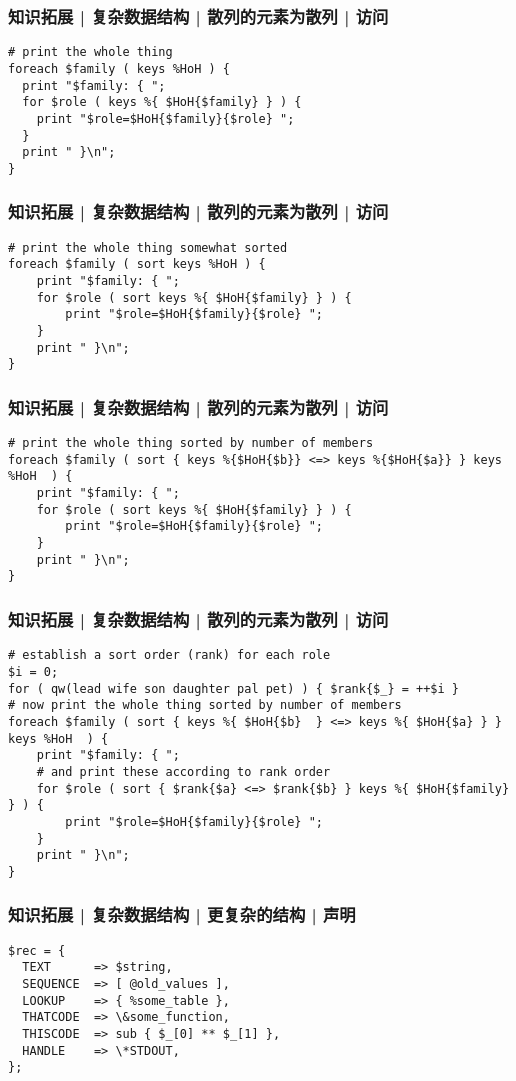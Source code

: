 \begin{frame}[fragile]
  \frametitle{知识拓展 | 复杂数据结构 | 散列的元素为散列 | 访问}
\begin{lstlisting}
# print the whole thing
foreach $family ( keys %HoH ) {
  print "$family: { ";
  for $role ( keys %{ $HoH{$family} } ) {
    print "$role=$HoH{$family}{$role} ";
  }
  print " }\n";
}
\end{lstlisting}
\end{frame}

\begin{frame}[fragile]
  \frametitle{知识拓展 | 复杂数据结构 | 散列的元素为散列 | 访问}
\begin{lstlisting}
# print the whole thing somewhat sorted
foreach $family ( sort keys %HoH ) {
    print "$family: { ";
    for $role ( sort keys %{ $HoH{$family} } ) {
        print "$role=$HoH{$family}{$role} ";
    }
    print " }\n";
}
\end{lstlisting}
\end{frame}

\begin{frame}[fragile]
  \frametitle{知识拓展 | 复杂数据结构 | 散列的元素为散列 | 访问}
\begin{lstlisting}
# print the whole thing sorted by number of members
foreach $family ( sort { keys %{$HoH{$b}} <=> keys %{$HoH{$a}} } keys %HoH  ) {
    print "$family: { ";
    for $role ( sort keys %{ $HoH{$family} } ) {
        print "$role=$HoH{$family}{$role} ";
    }
    print " }\n";
}
\end{lstlisting}
\end{frame}

\begin{frame}[fragile]
  \frametitle{知识拓展 | 复杂数据结构 | 散列的元素为散列 | 访问}
  \vspace{-0.8em}
\begin{lstlisting}
# establish a sort order (rank) for each role
$i = 0;
for ( qw(lead wife son daughter pal pet) ) { $rank{$_} = ++$i }
# now print the whole thing sorted by number of members
foreach $family ( sort { keys %{ $HoH{$b}  } <=> keys %{ $HoH{$a} } } keys %HoH  ) {
    print "$family: { ";
    # and print these according to rank order
    for $role ( sort { $rank{$a} <=> $rank{$b} } keys %{ $HoH{$family} } ) {
        print "$role=$HoH{$family}{$role} ";
    }
    print " }\n";
}
\end{lstlisting}
\end{frame}

\begin{frame}[fragile]
  \frametitle{知识拓展 | 复杂数据结构 | 更复杂的结构 | 声明}
\begin{lstlisting}
$rec = {
  TEXT      => $string,
  SEQUENCE  => [ @old_values ],
  LOOKUP    => { %some_table },
  THATCODE  => \&some_function,
  THISCODE  => sub { $_[0] ** $_[1] },
  HANDLE    => \*STDOUT,
};
\end{lstlisting}
\end{frame}

